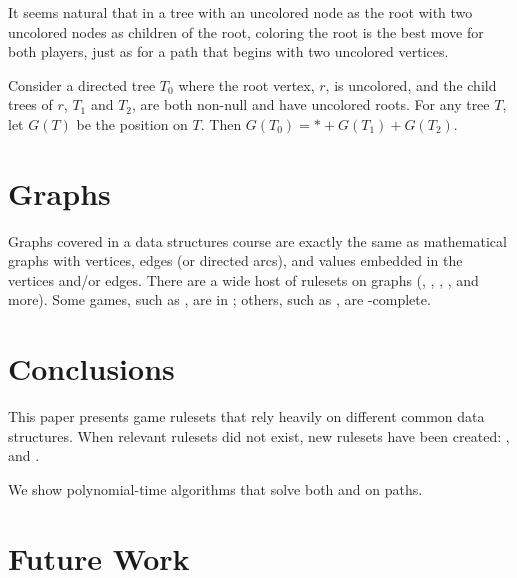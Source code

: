 \documentclass[letter,10pt]{article}
\begin{document}
It seems natural that in a tree with an uncolored node as the root with two uncolored nodes as children of the root, coloring the root is the best move for both players, just as for a path that begins with two uncolored vertices.

\begin{conjecture}
    Consider a directed tree $T_0$ where the root vertex, $r$, is uncolored, and the child trees of $r$, $T_1$ and $T_2$, are both non-null and have uncolored roots.  For any tree $T$, let $G(T)$ be the  position on $T$.  Then $G(T_0) = * + G(T_1) + G(T_2)$.
\end{conjecture}











\section{Graphs}
\label{section:graphs}

Graphs covered in a data structures course are exactly the same as mathematical graphs with vertices, edges (or directed arcs), and values embedded in the vertices and/or edges.  There are a wide host of rulesets on graphs (\cite{ONAG:2001}, , \cite{WinningWays:2001}, \cite{DBLP:journals/tcs/Fukuyama03}, and more).  Some games, such as , are in \cite{DBLP:journals/tcs/FraenkelSU93}; others, such as , are -complete\cite{DBLP:journals/jcss/Schaefer78}.

\section{Conclusions}

This paper presents game rulesets that rely heavily on different common data structures.  When relevant rulesets did not exist, new rulesets have been created: , and .  

We show polynomial-time algorithms that solve both  and  on paths.

\section{Future Work}
\end{document}
